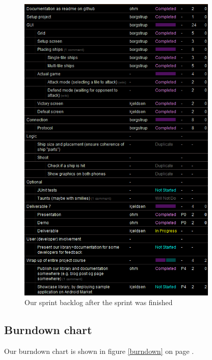 \documentclass[a4paper,11pt]{article}
\begin{document}
  \begin{figure}[ht!]
  	\begin{center}
  	\includegraphics[width=0.85\textwidth]{sprint_backlog.png}		
  	\end{center}
  	\caption{Our sprint backlog after the sprint was finished}
  	\label{sprintbacklog}
  \end{figure}

\subsection{Burndown chart}

Our burndown chart is shown in figure \ref{burndown} on page \pageref{burndown}.
\end{document}
